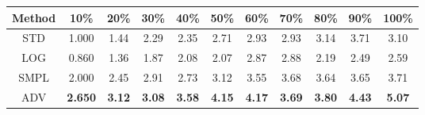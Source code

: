 \documentclass{standalone}
\begin{document}
\begin{tabular}{c|cccccccccc}
      \toprule
      Method & 10\% & 20\% & 30\% & 40\% & 50\% & 60\% & 70\% & 80\% & 90\% & 100\% \\
      \midrule
STD & 1.000 & 1.44 & 2.29 & 2.35 & 2.71 & 2.93 & 2.93 & 3.14 & 3.71 & 3.10\\
LOG & 0.860 & 1.36 & 1.87 & 2.08 & 2.07 & 2.87 & 2.88 & 2.19 & 2.49 & 2.59\\
SMPL & 2.000 & 2.45 & 2.91 & 2.73 & 3.12 & 3.55 & 3.68 & 3.64 & 3.65 & 3.71\\
ADV & \textbf{2.650} & \textbf{3.12} & \textbf{3.08} & \textbf{3.58} & \textbf{4.15} & \textbf{4.17} & \textbf{3.69} & \textbf{3.80} & \textbf{4.43} & \textbf{5.07}\\
  \bottomrule
\end{tabular}
\end{document}
